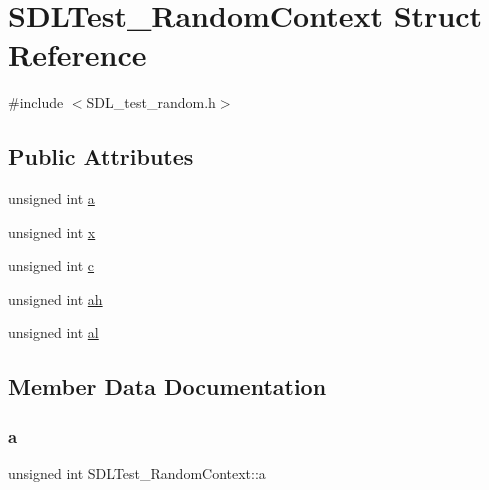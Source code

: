 \hypertarget{struct_s_d_l_test___random_context}{}\section{S\+D\+L\+Test\+\_\+\+Random\+Context Struct Reference}
\label{struct_s_d_l_test___random_context}


{\ttfamily \#include $<$S\+D\+L\+\_\+test\+\_\+random.\+h$>$}

\subsection*{Public Attributes}
\begin{DoxyCompactItemize}
\item 
unsigned int \mbox{\hyperlink{struct_s_d_l_test___random_context_a24f830d6cb476c96fbe325c99331e45f}{a}}
\item 
unsigned int \mbox{\hyperlink{struct_s_d_l_test___random_context_a8bd6d1b4e1677ed1c06f5cc09f1af5b6}{x}}
\item 
unsigned int \mbox{\hyperlink{struct_s_d_l_test___random_context_a17a6a7e7b68a33c67d9b74c8c7c33198}{c}}
\item 
unsigned int \mbox{\hyperlink{struct_s_d_l_test___random_context_a2c8d2f1ee16cdfd38361b8f03b3fdb85}{ah}}
\item 
unsigned int \mbox{\hyperlink{struct_s_d_l_test___random_context_a0e2bccd3611d383d6510c6c828aa54c4}{al}}
\end{DoxyCompactItemize}


\subsection{Member Data Documentation}
\mbox{\label{struct_s_d_l_test___random_context_a24f830d6cb476c96fbe325c99331e45f}} 
\subsubsection{\texorpdfstring{a}{a}}
{\footnotesize\ttfamily unsigned int S\+D\+L\+Test\+\_\+\+Random\+Context\+::a}

\mbox{\label{struct_s_d_l_test___random_context_a2c8d2f1ee16cdfd38361b8f03b3fdb85}} 
